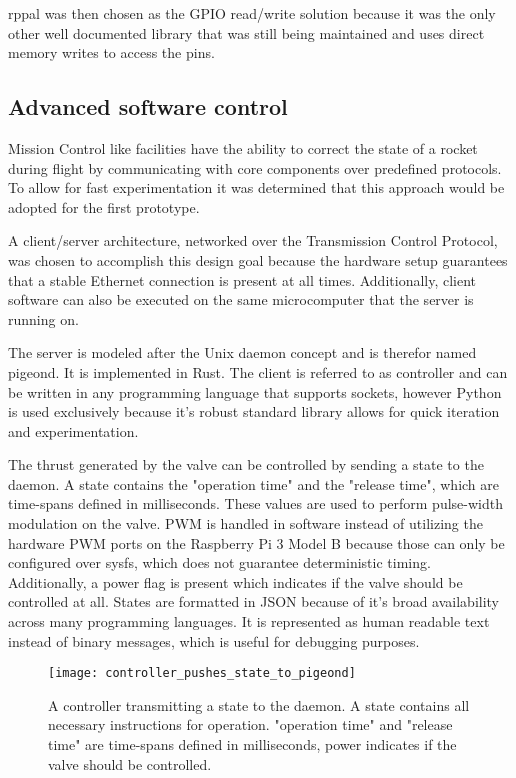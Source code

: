 rppal \cite{rppal} was then chosen as the GPIO read/write solution because it was the only other well documented library that was still being maintained and uses direct memory writes to access the pins.


\subsection{Advanced software control}
Mission Control like facilities have the ability to correct the state of a rocket during flight by communicating with core components over predefined protocols. To allow for fast experimentation it was determined that this approach would be adopted for the first prototype.

A client/server architecture, networked over the Transmission Control Protocol, was chosen to accomplish this design goal because the hardware setup guarantees that a stable Ethernet connection is present at all times. Additionally, client software can also be executed on the same microcomputer that the server is running on.

The server is modeled after the Unix daemon concept and is therefor named pigeond. It is implemented in Rust. The client is referred to as controller and can be written in any programming language that supports sockets, however Python is used exclusively because it's robust standard library allows for quick iteration and experimentation.

The thrust generated by the valve can be controlled by sending a state to the daemon. A state contains the "operation time" and the "release time", which are time-spans defined in milliseconds. These values are used to perform pulse-width modulation on the valve. PWM is handled in software instead of utilizing the hardware PWM ports on the Raspberry Pi 3 Model B because those can only be configured over sysfs, which does not guarantee deterministic timing. Additionally, a power flag is present which indicates if the valve should be controlled at all. States are formatted in JSON \cite{json} because of it's broad availability across many programming languages. It is represented as human readable text instead of binary messages, which is useful for debugging purposes. 

\begin{figure}[h]
\centering

\texttt{[image: controller\_pushes\_state\_to\_pigeond]}

\caption{A controller transmitting a state to the daemon. A state contains all necessary instructions for operation. "operation time" and "release time" are time-spans defined in milliseconds, power indicates if the valve should be controlled.}
\end{figure}

